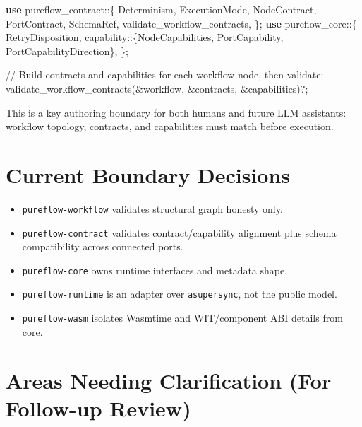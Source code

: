 \documentclass[
  letterpaper,
]{report}
\newenvironment{Shaded}{\begin{snugshade}}{\end{snugshade}}
\newcommand{\CommentTok}[1]{\textcolor[rgb]{0.37,0.37,0.37}{#1}}
\newcommand{\KeywordTok}[1]{\textcolor[rgb]{0.00,0.23,0.31}{\textbf{#1}}}
\newcommand{\NormalTok}[1]{\textcolor[rgb]{0.00,0.23,0.31}{#1}}
\newcommand{\OperatorTok}[1]{\textcolor[rgb]{0.37,0.37,0.37}{#1}}
\newcommand{\PreprocessorTok}[1]{\textcolor[rgb]{0.68,0.00,0.00}{#1}}
\providecommand{\tightlist}{%
  \setlength{\itemsep}{0pt}\setlength{\parskip}{0pt}}
\begin{document}
\begin{Shaded}
\begin{Highlighting}[]
\KeywordTok{use} \PreprocessorTok{pureflow\_contract::}\OperatorTok{\{}
\NormalTok{    Determinism}\OperatorTok{,}\NormalTok{ ExecutionMode}\OperatorTok{,}\NormalTok{ NodeContract}\OperatorTok{,}\NormalTok{ PortContract}\OperatorTok{,}\NormalTok{ SchemaRef}\OperatorTok{,}
\NormalTok{    validate\_workflow\_contracts}\OperatorTok{,}
\OperatorTok{\};}
\KeywordTok{use} \PreprocessorTok{pureflow\_core::}\OperatorTok{\{}
\NormalTok{    RetryDisposition}\OperatorTok{,}
    \PreprocessorTok{capability::}\OperatorTok{\{}\NormalTok{NodeCapabilities}\OperatorTok{,}\NormalTok{ PortCapability}\OperatorTok{,}\NormalTok{ PortCapabilityDirection}\OperatorTok{\},}
\OperatorTok{\};}

\CommentTok{// Build contracts and capabilities for each workflow node, then validate:}
\NormalTok{validate\_workflow\_contracts(}\OperatorTok{\&}\NormalTok{workflow}\OperatorTok{,} \OperatorTok{\&}\NormalTok{contracts}\OperatorTok{,} \OperatorTok{\&}\NormalTok{capabilities)}\OperatorTok{?;}
\end{Highlighting}
\end{Shaded}

This is a key authoring boundary for both humans and future LLM
assistants: workflow topology, contracts, and capabilities must match
before execution.

\section{Current Boundary Decisions}\label{current-boundary-decisions}

\begin{itemize}
\tightlist
\item
  \texttt{pureflow-workflow} validates structural graph honesty only.
\item
  \texttt{pureflow-contract} validates contract/capability alignment plus
  schema compatibility across connected ports.
\item
  \texttt{pureflow-core} owns runtime interfaces and metadata shape.
\item
  \texttt{pureflow-runtime} is an adapter over \texttt{asupersync}, not
  the public model.
\item
  \texttt{pureflow-wasm} isolates Wasmtime and WIT/component ABI details
  from core.
\end{itemize}

\section{Areas Needing Clarification (For Follow-up
Review)}\label{areas-needing-clarification-for-follow-up-review}
\end{document}
